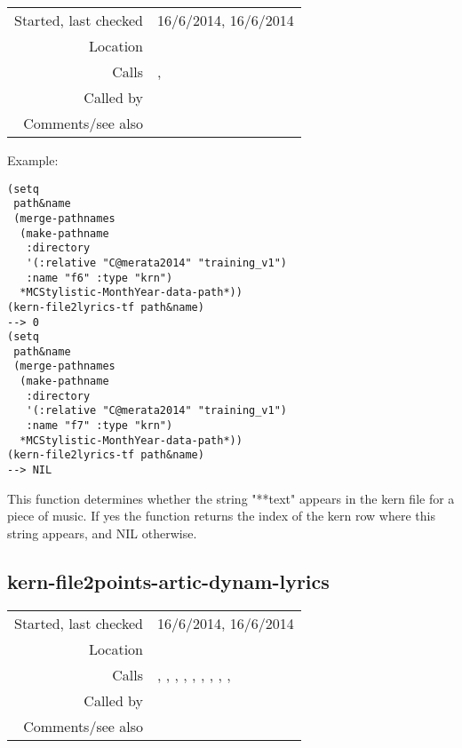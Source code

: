 \vspace{0.3cm}
\begin{tabular}{r|p{8cm}}
Started, last checked & 16/6/2014, 16/6/2014 \\
Location & \nameref{sec:kern-articulation} \\
Calls & \nameref{fun:read-from-file-arbitrary},\newline \nameref{fun:tab-separated-string2list} \\
Called by & \nameref{fun:kern-file2points-artic-dynam-lyrics} \\
Comments/see also &
\end{tabular}

\vspace{0.5cm}
\noindent Example:
\begin{verbatim}
(setq
 path&name
 (merge-pathnames
  (make-pathname
   :directory
   '(:relative "C@merata2014" "training_v1")
   :name "f6" :type "krn")
  *MCStylistic-MonthYear-data-path*))
(kern-file2lyrics-tf path&name)
--> 0
(setq
 path&name
 (merge-pathnames
  (make-pathname
   :directory
   '(:relative "C@merata2014" "training_v1")
   :name "f7" :type "krn")
  *MCStylistic-MonthYear-data-path*))
(kern-file2lyrics-tf path&name)
--> NIL
\end{verbatim}

\noindent This function determines whether the string
"**text" appears in the kern file for a piece of
music. If yes the function returns the index of the
kern row where this string appears, and NIL
otherwise.


\subsection*{kern-file2points-artic-dynam-lyrics}\label{fun:kern-file2points-artic-dynam-lyrics}

\vspace{0.3cm}
\begin{tabular}{r|p{8cm}}
Started, last checked & 16/6/2014, 16/6/2014 \\
Location & \nameref{sec:kern-articulation} \\
Calls & \nameref{fun:kern-anacrusis-correction}, \newline \nameref{fun:kern-cols2points-artic-dynam-lyrics}, \newline \nameref{fun:kern-file2dynamics-tf}, \nameref{fun:kern-file2lyrics-tf}, \newline \nameref{fun:kern-rows2col}, \nameref{fun:read-from-file-arbitrary}, \newline \nameref{fun:sort-dataset-asc}, \newline \nameref{fun:staves-info2staves-variable-robust}, \newline \nameref{fun:tab-separated-string2list}, \nameref{fun:test-all-true} \\
Called by & \\
Comments/see also &
\end{tabular}

